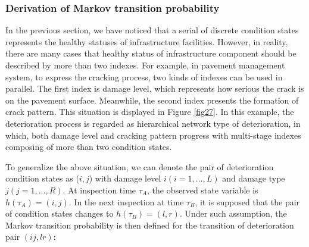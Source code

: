 \subsubsection{Derivation of Markov transition probability}
\label{2421}
In the previous section, we have noticed that a serial of discrete condition states represents the healthy statuses of infrastructure facilities. However, in reality, there are many cases that healthy status of infrastructure component should be described by more than two indexes. For example, in pavement management system, to express the cracking process, two kinds of indexes can be used in parallel. The first index is damage level, which represents how serious the crack is on the pavement surface. Meanwhile, the second index presents the formation of crack pattern. This situation is displayed in Figure \ref{fig27}. In this example, the deterioration process is regarded as hierarchical network type of deterioration, in which, both damage level and cracking pattern progress with multi-stage indexes composing of more than two condition states.

To generalize the above situation, we can denote the pair of deterioration condition states as ($i,j$) with damage level $i(i=1,...,L)$ and damage type $j(j=1,...,R)$. At inspection time $\tau_A$, the observed state variable is $h(\tau_A)=(i,j)$. In the next inspection at time $\tau_B$, it is supposed that the pair of condition states changes to $h(\tau_B)=(l,r)$. Under such assumption, the Markov transition probability is then defined for the transition of deterioration pair $(ij,lr)$:

